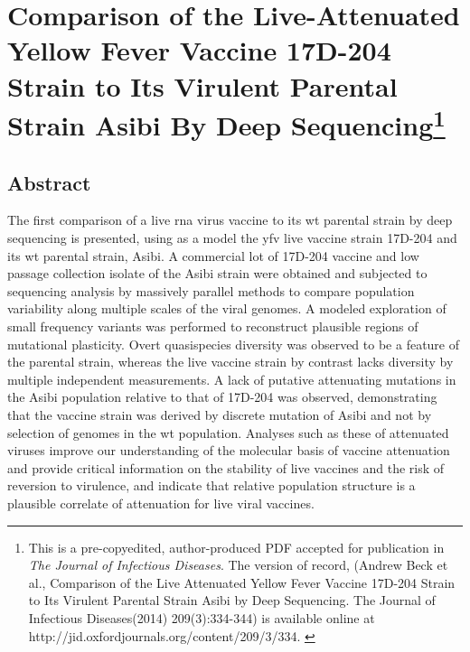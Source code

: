 \chapter[Comparison of the Live-Attenuated Yellow Fever Vaccine 17D-204 Strain
	to Its Virulent Parental Strain Asibi By Deep Sequencing]{Comparison of the Live-Attenuated Yellow Fever Vaccine 17D-204 Strain
		to Its Virulent Parental Strain Asibi By Deep Sequencing\footnote{This is a pre-copyedited, author-produced PDF accepted for publication in \emph{ The Journal of Infectious Diseases}. The version of record, (Andrew Beck et al., Comparison of the Live Attenuated Yellow Fever Vaccine 17D-204 Strain to Its Virulent Parental Strain Asibi by Deep Sequencing. The Journal of Infectious Diseases(2014) 209(3):334-344) is available online at http://jid.oxfordjournals.org/content/209/3/334. \parencite{Beck:2014cm}}}

\section{Abstract}
The first comparison of a live \gls{rna} virus vaccine to its \gls{wt} parental strain by deep sequencing is presented, using as a model the \gls{yfv} live vaccine strain 17D-204 and its \gls{wt} parental strain, Asibi. A commercial lot of 17D-204 vaccine and low passage collection isolate of the Asibi strain were obtained and subjected to sequencing analysis by massively parallel methods to compare population variability along multiple scales of the viral genomes. A modeled exploration of small frequency variants was performed to reconstruct plausible regions of mutational plasticity. Overt quasispecies diversity was observed to be a feature of the parental strain, whereas the live vaccine strain by contrast lacks diversity by multiple independent measurements. A lack of putative attenuating mutations in the Asibi population relative to that of 17D-204 was observed, demonstrating that the vaccine strain was derived by discrete mutation of Asibi and not by selection of genomes in the \gls{wt} population. Analyses such as these of attenuated viruses improve our understanding of the molecular basis of vaccine attenuation and provide critical information on the stability of live vaccines and the risk of reversion to virulence, and indicate that relative population structure is a plausible correlate of attenuation for live viral vaccines.
